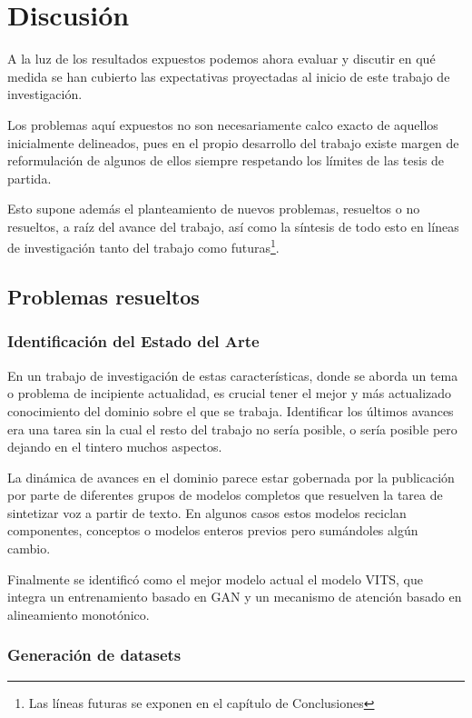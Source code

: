 \section{Discusión}

A la luz de los resultados expuestos podemos ahora evaluar y discutir en qué medida se han cubierto las expectativas proyectadas al inicio de este trabajo de investigación.

Los problemas aquí expuestos no son necesariamente calco exacto de aquellos inicialmente delineados, pues en el propio desarrollo del trabajo existe margen de reformulación de algunos de ellos siempre respetando los límites de las tesis de partida.

Esto supone además el planteamiento de nuevos problemas, resueltos o no resueltos, a raíz del avance del trabajo, así como la síntesis de todo esto en líneas de investigación tanto del trabajo como futuras\footnote{Las líneas futuras se exponen en el capítulo de Conclusiones}.

\subsection{Problemas resueltos}

\subsubsection{Identificación del Estado del Arte}

En un trabajo de investigación de estas características, donde se aborda un tema o problema de incipiente actualidad, es crucial tener el mejor y más actualizado conocimiento del dominio sobre el que se trabaja. Identificar los últimos avances era una tarea sin la cual el resto del trabajo no sería posible, o sería posible pero dejando en el tintero muchos aspectos.

La dinámica de avances en el dominio parece estar gobernada por la publicación por parte de diferentes grupos de modelos completos que resuelven la tarea de sintetizar voz a partir de texto. En algunos casos estos modelos reciclan componentes, conceptos o modelos enteros previos pero sumándoles algún cambio.

Finalmente se identificó como el mejor modelo actual el modelo VITS, que integra un entrenamiento basado en GAN y un mecanismo de atención basado en alineamiento monotónico.

\subsubsection{Generación de datasets}

